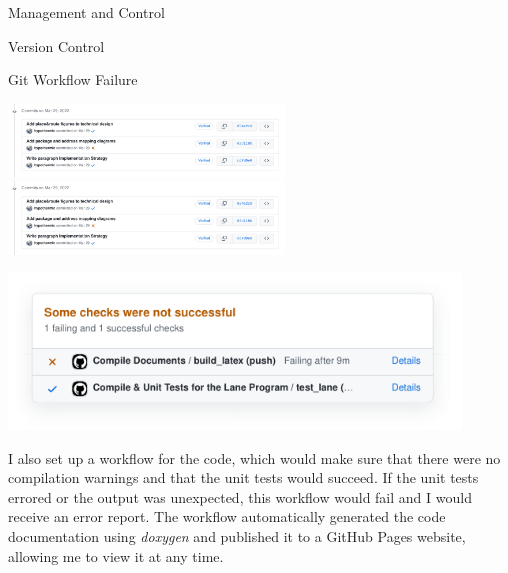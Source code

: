 \documentclass{matthijs}
\begin{document}
\begin{hoofdstuk}{Management and Control}
\begin{paragraaf}{Version Control}
			\begin{figuur}{Git Workflow Failure}
				\centerline{
					\includegraphics[width=0.55\textwidth, clip, trim=0cm 0cm 15cm 0cm]{git-commits-crop2.pdf}
					\includegraphics[width=0.55\textwidth, clip, trim=15cm 0cm 0cm 0cm]{git-commits-crop2.pdf}
					\hspace{2ex}
				}
				\vspace{-2ex}
				\includegraphics[width=0.9\textwidth]{git-commits-fail-crop.pdf}
				\vspace{-2.5ex}
			\end{figuur}

			\noindent I also set up a workflow for the code, which would make sure that there were no compilation warnings and that the unit tests would succeed.
			If the unit tests errored or the output was unexpected, this workflow would fail and I would receive an error report.
			The workflow automatically generated the code documentation using \textit{doxygen} and published it to a GitHub Pages website, allowing me to view it at any time.

		\end{paragraaf}

	\end{hoofdstuk}
	
\end{document}
